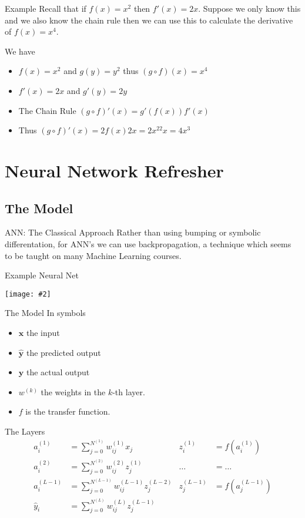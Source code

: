 \documentclass{beamer}
\newcommand {\framedgraphic}[2] {
    \begin{frame}{#1}
        \begin{center}
            \texttt{[image: \#2]}
        \end{center}
    \end{frame}
}
\begin{document}
\begin{frame}[fragile]{Example}
Recall that if $f(x) = x^2$ then $f'(x) = 2x$. Suppose we only know
this and we also know the chain rule then we can use this to calculate
the derivative of $f(x) = x^4$.

We have
\begin{itemize}
\item
$f(x) = x^2$ and $g(y) = y^2$ thus $(g \circ f)(x) = x^4$
\item
$f'(x) = 2x$ and $g'(y) = 2y$
\item
The Chain Rule $(g \circ f)'(x) = g'(f(x))f'(x)$
\item
Thus $(g \circ f)'(x) = 2f(x)2x = 2x^22x = 4x^3$
\end{itemize}
\end{frame}

\section{Neural Network Refresher}

\subsection{The Model}

\begin{frame}[fragile]{ANN: The Classical Approach}
Rather than using bumping or symbolic differentation, for ANN's we can
use backpropagation, a technique which seems to be taught on many
Machine Learning courses.
\end{frame}

\framedgraphic{Example Neural Net}{diagrams/ca75393cd25ce951edcd7133da24a2c6.png}

\begin{frame}[fragile]{The Model}
In symbols
\begin{itemize}
\item $\boldsymbol{x}$ the input
\item $\hat{\boldsymbol{y}}$ the predicted output
\item $\boldsymbol{y}$ the actual output
\item $w^{(k)}$ the weights in the $k$-th layer.
\item $f$ is the transfer function.
\end{itemize}
\end{frame}

\begin{frame}[fragile]{The Layers}
$$
\begin{aligned}
a_i^{(1)}   &= \sum_{j=0}^{N^{(1)}} w_{ij}^{(1)} x_j       & z_i^{(1)} &= f(a_i^{(1)}) \\
a_i^{(2)}   &= \sum_{j=0}^{N^{(2)}} w_{ij}^{(2)} z_j^{(1)} &  \dots     &= \ldots \\
a_i^{(L-1)} &= \sum_{j=0}^{N^{(L-1)}} w_{ij}^{(L-1)} z_j^{(L-2)} & z_j^{(L-1)} &= f(a_j^{(L-1)}) \\
\hat{y}_i  &= \sum_{j=0}^{N^{(L)}} w_{ij}^{(L)} z_j^{(L-1)} \\
\end{aligned}
$$
\end{frame}
\end{document}
